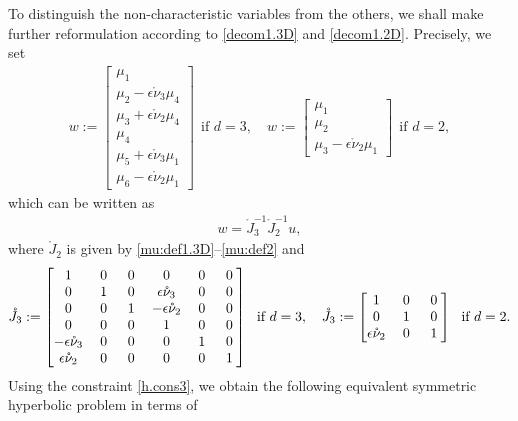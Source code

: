 \documentclass[twoside,11pt]{article}
\numberwithin{equation}{section}
\newcommand\w[1]{\makebox[1em]{$#1$}}
\begin{document}
To distinguish the non-characteristic variables from the others,
we shall make further reformulation according to \eqref{decom1.3D} and \eqref{decom1.2D}.
Precisely, we set
	\begin{align}
		w:=\begin{bmatrix}
			\mu_1  \\[0.5mm]
			\mu_2-\epsilon \mathring{\nu}_3{\mu_4} \\[0.5mm]
			\mu_3+\epsilon \mathring{\nu}_2{\mu_4} \\[0.5mm] 		
			{\mu_4}  \\[0.5mm]
			\mu_5+\epsilon \mathring{\nu}_3\mu_1 \\[0.5mm]
			\mu_6-\epsilon \mathring{\nu}_2\mu_1
		\end{bmatrix}
		\ \ \textrm{if }d=3,
		\quad
	w:=\begin{bmatrix}
	\mu_1  \\[0.5mm]  \mu_2 \\[0.5mm] \mu_3-\epsilon \mathring{\nu}_2\mu_1
\end{bmatrix}		
		\ \ \textrm{if }d=2,	
		\label{w:def1}	
	\end{align}
which can be written as
\begin{align}
	w=\mathring{J}_3^{-1}\mathring{J}_2^{-1}u,
		\label{w:def2}		
\end{align}	
where $\mathring{J}_2$ is given by \eqref{mu:def1.3D}--\eqref{mu:def2}
and
	\begin{align}
		\label{J3.ring:def}
		\mathring{J}_3:=
		\begin{bmatrix}
			1 & \w{0}& \w{0}& 0& 0&0\\
			0& 1& 0  & \epsilon \mathring{\nu}_3& 0& 0\\
			0&0&1 & -\epsilon \mathring{\nu}_2& 0 & 0\\
			0& 0&0 &1 & 0& 0\\
			-\epsilon \mathring{\nu}_3& \w{0}& \w{0}&	\w{0}& \w{1}&\w{0} \\
			\epsilon \mathring{\nu}_2 & 0 & 0 &0&0&1 		
		\end{bmatrix}\ \ \textrm{if }d=3,
		\quad
\mathring{J}_3:=
\begin{bmatrix}
	1 & 0& 0\\
	0 & 1 & 0\\
	\epsilon \mathring{\nu}_2 & \w{0} &\w{1}
\end{bmatrix}\  \ \textrm{if }d=2.
	\end{align}
	Using the constraint \eqref{h.cons3}, we obtain the following equivalent symmetric hyperbolic problem in terms of
\end{document}
